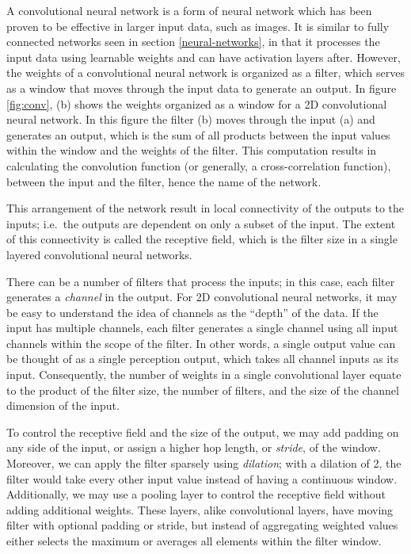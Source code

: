 \documentclass[12pt,a4paper,]{report}
\begin{document}
A convolutional neural network is a form of neural network which has
been proven to be effective in larger input data, such as images. It is
similar to fully connected networks seen in section
\ref{neural-networks}, in that it processes the input data using
learnable weights and can have activation layers after. However, the
weights of a convolutional neural network is organized as a filter,
which serves as a window that moves through the input data to generate
an output. In figure \ref{fig:conv}, (b) shows the weights organized as
a window for a 2D convolutional neural network. In this figure the
filter (b) moves through the input (a) and generates an output, which is
the sum of all products between the input values within the window and
the weights of the filter. This computation results in calculating the
convolution function (or generally, a cross-correlation function),
between the input and the filter, hence the name of the network.

This arrangement of the network result in local connectivity of the
outputs to the inputs; i.e.~the outputs are dependent on only a subset
of the input. The extent of this connectivity is called the receptive
field, which is the filter size in a single layered convolutional neural
networks.

There can be a number of filters that process the inputs; in this case,
each filter generates a \emph{channel} in the output. For 2D
convolutional neural networks, it may be easy to understand the idea of
channels as the ``depth'' of the data. If the input has multiple
channels, each filter generates a single channel using all input
channels within the scope of the filter. In other words, a single output
value can be thought of as a single perception output, which takes all
channel inputs as its input. Consequently, the number of weights in a
single convolutional layer equate to the product of the filter size, the
number of filters, and the size of the channel dimension of the input.

To control the receptive field and the size of the output, we may add
padding on any side of the input, or assign a higher hop length, or
\emph{stride}, of the window. Moreover, we can apply the filter sparsely
using \emph{dilation}; with a dilation of 2, the filter would take every
other input value instead of having a continuous window. Additionally,
we may use a pooling layer to control the receptive field without adding
additional weights. These layers, alike convolutional layers, have
moving filter with optional padding or stride, but instead of
aggregating weighted values either selects the maximum or averages all
elements within the filter window.
\end{document}
